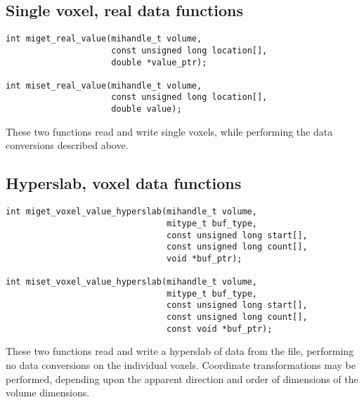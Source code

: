 \documentclass{article}
\begin{document}
\subsection{Single voxel, real data functions}
\begin{verbatim}
int miget_real_value(mihandle_t volume,
                     const unsigned long location[],
                     double *value_ptr);

int miset_real_value(mihandle_t volume,
                     const unsigned long location[],
                     double value);
\end{verbatim}

These two functions read and write single voxels, while performing the data
conversions described above.

\subsection{Hyperslab, voxel data functions}
\begin{verbatim}
int miget_voxel_value_hyperslab(mihandle_t volume,
                                mitype_t buf_type,
                                const unsigned long start[],
                                const unsigned long count[],
                                void *buf_ptr);

int miset_voxel_value_hyperslab(mihandle_t volume, 
                                mitype_t buf_type,
                                const unsigned long start[],
                                const unsigned long count[],
                                const void *buf_ptr);
\end{verbatim}

These two functions read and write a hyperslab of data from the file, 
performing no data conversions on the individual voxels.  Coordinate
transformations may be performed, depending upon the apparent direction
and order of dimensions of the volume dimensions.
\end{document}
